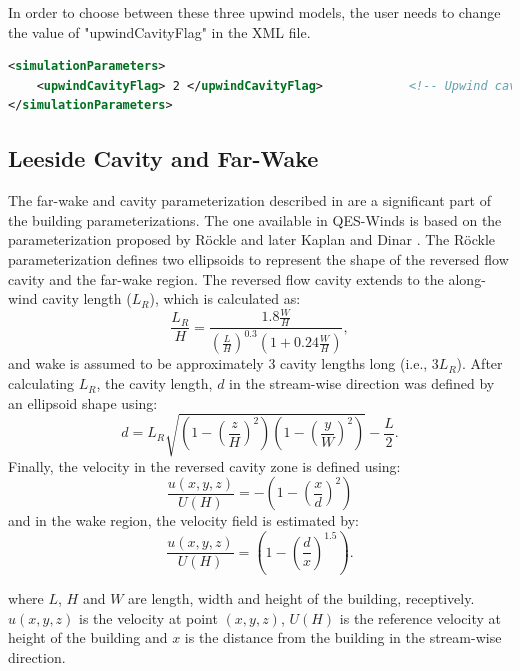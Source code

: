 In order to choose between these three upwind models, the user needs to change the value of "upwindCavityFlag" in the XML file.


\begin{lstlisting}[language=XML]
<simulationParameters>
  	<upwindCavityFlag> 2 </upwindCavityFlag> 			<!-- Upwind cavity flag (0-none, 1-Rockle, 2-MVP (default), 3-HMVP) -->
</simulationParameters>
\end{lstlisting}

\subsection{Leeside Cavity and Far-Wake}\label{leeside-cavity-and-far-wake}

The far-wake and cavity parameterization described in \cite{singh2005testing,singh2006testing} are a significant part of the building parameterizations. The one available in QES-Winds is based on the parameterization proposed by R\"{o}ckle \cite{rockle1990bestimmung} and later Kaplan and Dinar \cite{kaplan1996lagrangian}. The R\"{o}ckle parameterization defines two ellipsoids to represent the shape of the reversed flow cavity and the far-wake region. The reversed flow cavity extends to the along-wind cavity length
($L_R$), which is calculated as:
\begin{equation}
\frac{L_{R}}{H}=\frac{1.8 \frac{W}{H}}{\left(\frac{L}{H}\right)^{0.3}\left(1+0.24 \frac{W}{H}\right)},
\label{eq:Lr}
\end{equation}
and wake is assumed to be approximately $3$ cavity lengths long (i.e., $3L_R$). After calculating $L_R$, the cavity length, $d$ in the stream-wise direction was defined by an ellipsoid shape using: 
\begin{equation}
d=L_{R} \sqrt{\left(1-\left(\frac{z}{H}\right)^{2}\right)\left(1-\left(\frac{y}{W}\right)^{2}\right)}-\frac{L}{2}.
\label{eq:d}
\end{equation} 
Finally, the velocity in the reversed cavity zone is defined using:
\begin{equation}
\frac{u(x, y, z)}{U(H)}=-\left(1-\left(\frac{x}{d}\right)^{2}\right)
\label{eq:cavity}
\end{equation}
and in the wake region, the velocity field is estimated by: 
\begin{equation}
\frac{u(x, y, z)}{U(H)}=\left(1-\left(\frac{d}{x}\right)^{1.5}\right).
\label{eq:wake}
\end{equation}

where $L$, $H$ and $W$ are length, width and height of the building, receptively. $u(x,y,z)$ is the velocity at point $(x,y,z)$, $U(H)$ is the reference velocity at height of the building and $x$ is the distance from the building in the stream-wise direction.

